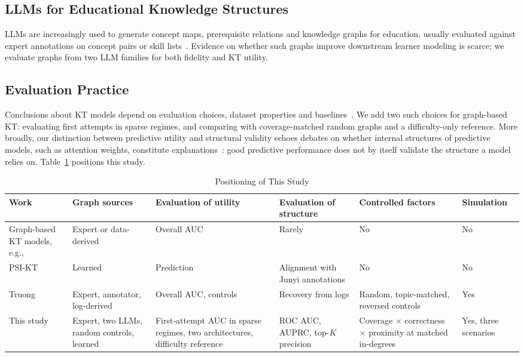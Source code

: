 \documentclass[lettersize,journal]{IEEEtran}
\begin{document}
\subsection{LLMs for Educational Knowledge Structures}
LLMs are increasingly used to generate concept maps, prerequisite relations and knowledge graphs for education, usually evaluated against expert annotations on concept pairs or skill lists~\cite{aytekin2025discovering,le2025llms,yang2025examining}. Evidence on whether such graphs improve downstream learner modeling is scarce; we evaluate graphs from two LLM families for both fidelity and KT utility.

\subsection{Evaluation Practice}
Conclusions about KT models depend on evaluation choices, dataset properties and baselines~\cite{khajah2016deep,wilson2016back,pelanek2017bayesian,gervet2020deep,liu2022pykt}. We add two such choices for graph-based KT: evaluating first attempts in sparse regimes, and comparing with coverage-matched random graphs and a difficulty-only reference. More broadly, our distinction between predictive utility and structural validity echoes debates on whether internal structures of predictive models, such as attention weights, constitute explanations~\cite{jain2019attention}: good predictive performance does not by itself validate the structure a model relies on. Table~\ref{tab:position} positions this study.

\begin{table}[t]
\centering
\caption{Positioning of This Study}
\label{tab:position}
\footnotesize
\setlength{\tabcolsep}{3pt}
\begin{tabular}{@{}p{2.9cm}p{2.7cm}p{3.2cm}p{2.6cm}p{2.9cm}p{1.6cm}@{}}
\toprule
Work & Graph sources & Evaluation of utility & Evaluation of structure & Controlled factors & Simulation \\
\midrule
Graph-based KT models, e.g.,~\cite{nakagawa2019graph,yang2020gikt,tong2020structure} & Expert or data-derived & Overall AUC & Rarely & No & No \\
PSI-KT~\cite{zhou2024predictive} & Learned & Prediction & Alignment with Junyi annotations & No & No \\
Truong~\cite{truong2026replication} & Expert, annotator, log-derived & Overall AUC, controls & Recovery from logs & Random, topic-matched, reversed controls & Yes \\
This study & Expert, two LLMs, random controls, learned & First-attempt AUC in sparse regimes, two architectures, difficulty reference & ROC AUC, AUPRC, top-$K$ precision & Coverage $\times$ correctness $\times$ proximity at matched in-degrees & Yes, three scenarios \\
\bottomrule
\end{tabular}
\end{table}
\end{document}

